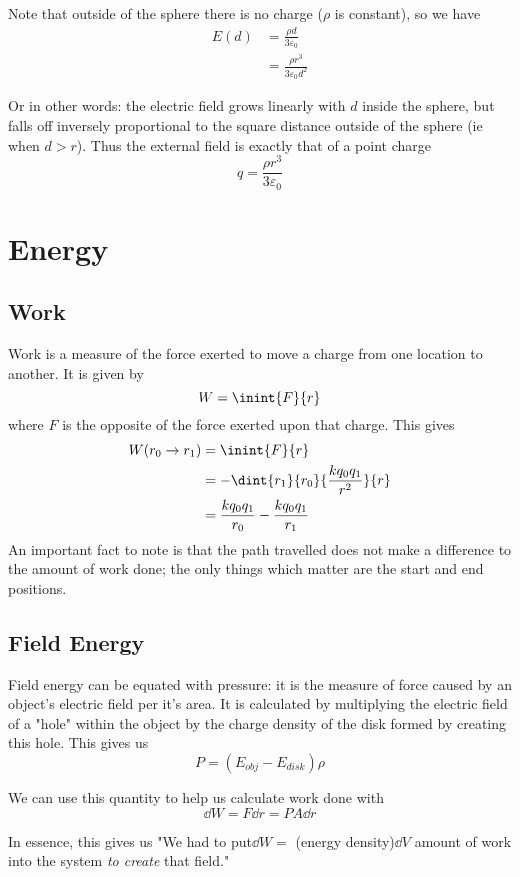 \documentclass[12pt]{article}
\begin{document}
Note that outside of the sphere there is no charge ($\rho$ is constant), so we have
\begin{align*}
E(d) &= \frac{\rho d}{3\varepsilon_0} \\
     &= \frac{\rho r^3}{3\varepsilon_0 d^2}
\end{align*}

Or in other words: the electric field grows linearly with $d$ inside the sphere, but falls off inversely proportional to the square distance outside of the sphere (ie when $d > r$). Thus the external field is exactly that of a point charge \[ q = \frac{\rho r^3}{3\varepsilon_0} \]

\section*{Energy}
\subsection*{Work}
Work is a measure of the force exerted to move a charge from one location to another. It is given by \[ W = \inint{F}{r} \] where $F$ is the opposite of the force exerted upon that charge. This gives
\begin{align*}
W(r_0 \to r_1) &= \inint{F}{r}\\
               &= - \dint{r_1}{r_0}{\frac{kq_0q_1}{r^2}}{r}\\
               &= \frac{kq_0q_1}{r_0} - \frac{kq_0q_1}{r_1}
\end{align*}
An important fact to note is that the path travelled does not make a difference to the amount of work done; the only things which matter are the start and end positions.

\subsection*{Field Energy}
Field energy can be equated with pressure: it is the measure of force caused by an object's electric field per it's area. It is calculated by multiplying the electric field of a "hole" within the object by the charge density of the disk formed by creating this hole. This gives us \[ P = (E_{obj} - E_{disk})\rho \]

We can use this quantity to help us calculate work done with \[ \dd W = F \dd r = PA \dd r \]

In essence, this gives us "We had to put$\dd W = $ (energy density)$\dd V$ amount of work into the system \emph{to create} that field."
\end{document}
